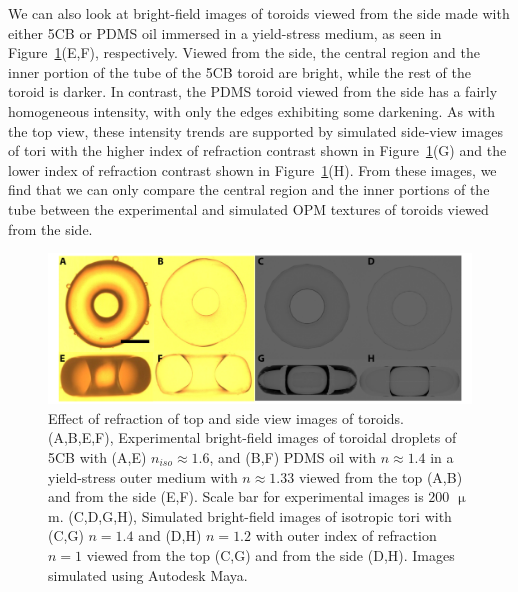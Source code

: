 We can also look at bright-field images of toroids viewed from the side made with either 5CB or PDMS oil immersed in a yield-stress medium, as seen in Figure~\ref{f:4-refraction}(E,F), respectively.
Viewed from the side, the central region and the inner portion of the tube of the 5CB toroid are bright, while the rest of the toroid is darker.
In contrast, the PDMS toroid viewed from the side has a fairly homogeneous intensity, with only the edges exhibiting some darkening.
As with the top view, these intensity trends are supported by simulated side-view images of tori with the higher index of refraction contrast shown in Figure~\ref{f:4-refraction}(G) and the lower index of refraction contrast shown in Figure~\ref{f:4-refraction}(H).
From these images, we find that we can only compare the central region and the inner portions of the tube between the experimental and simulated OPM textures of toroids viewed from the side.
\begin{figure}
\centering
\includegraphics{figures/C4/Ch4-Figs_RefractionTest.png}
\caption{Effect of refraction of top and side view images of toroids.
(A,B,E,F), Experimental bright-field images of toroidal droplets of 5CB with (A,E) $n_{iso} \approx 1.6$, and (B,F) PDMS oil with $n \approx 1.4$ in a yield-stress outer medium with $n \approx 1.33$ viewed from the top (A,B) and from the side (E,F).
Scale bar for experimental images is $200$ $\upmu$m.
(C,D,G,H), Simulated bright-field images of isotropic tori with (C,G) $n =1.4$ and (D,H) $n=1.2$ with outer index of refraction $n = 1$ viewed from the top (C,G) and from the side (D,H).
Images simulated using Autodesk Maya.}\label{f:4-refraction}
\end{figure}

